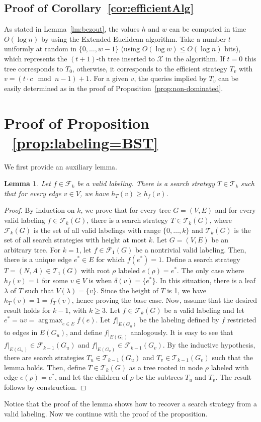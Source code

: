 \documentclass[11pt]{article}
\newtheorem{lemma}{Lemma}[section]
\newcommand{\BSTs}{\mathcal{T}}
\newcommand{\X}{\mathcal{X}}
\DeclareMathOperator*{\argmax}{arg\,max}
\newcommand\+{\mkern2mu}
\newcommand{\T}{T}
\begin{document}
 \subsection{Proof of Corollary~\ref{cor:efficientAlg}}
    
    As stated in Lemma~\ref{lm:bezout}, the values $h$ and $w$ can be computed in time $O(\log n)$ by using the Extended Euclidean algorithm. Take a number $t$ uniformly at random in $\{0,\ldots,w-1\}$ (using $O(\log w)\le O(\log n)$ bits), which represents the $(t+1)$-th tree inserted to $\X$ in the algorithm. If $t=0$ this tree corresponds to $\T_0$, otherwise, it corresponds to the efficient strategy $\T_v$ with $v= (t\cdot c \mod n-1) +1$. For a given $v$, the queries implied by $\T_v$ can be easily determined as in the proof of Proposition~\ref{prop:non-dominated}.

\section{Proof of Proposition ~\ref{prop:labeling=BST}}
    We first provide an auxiliary lemma.

\begin{lemma} \label{lm:labeling<=BST}
    Let $f \in \mathcal{F}_k$ be a valid labeling. There is a search strategy $T \in \BSTs_k$ such that for every edge $v \in V$, we have $h_T(v) \geq h_f(v)$.
\end{lemma}
\begin{proof}
    By induction on $k$, we prove that for every tree $G=(V, E)$ and for every valid labeling $f \in \mathcal{F}_k(G)$, there is a search strategy $T \in \BSTs_k(G)$, where $\mathcal{F}_k(G)$ is the set of all valid labelings with range $\{0, \ldots, k\}$  and $\BSTs_k(G)$ is the set of all search strategies with height at most $k$. Let $G=(V, E)$ be an arbitrary tree. For $k=1$, let $f \in \mathcal{F}_1(G)$ be a nontrivial valid labeling. Then, there is a unique edge $e^* \in E$ for which $f(e^*)=1$. Define a search strategy $T =(N, A) \in \BSTs_1(G)$ with root $\rho$ labeled $e(\rho) = e^*$. The only case where $h_f(v) = 1$ for some $v \in V$ is when $\delta(v) = \{e^*\}$. In this situation, there is a leaf $\lambda$ of $T$ such that $V(\lambda) = \{v\}$. Since the height of $T$ is 1, we have $h_T(v) = 1 = f_T(v)$, hence proving the base case. Now, assume that the desired result holds for $k-1$, with $k \geq 3$. Let $f \in \mathcal{F}_k(G)$ be a valid labeling and let $ e^* = uv = \argmax_{e \in E}f(e)$. Let $f|_{E(G_u)}$ be the labeling defined by $f$ restricted to edges in $E(G_u)$, and define $f|_{E(G_v)}$ analogously. It is easy to see that $f|_{E(G_u)} \in \mathcal{F}_{k-1}(G_u)$ and $f|_{E(G_v)} \in \mathcal{F}_{k-1}(G_v)$. By the inductive hypothesis, there are search strategies $T_u \in \BSTs_{k-1}(G_u)$ and $T_v \in \BSTs_{k-1}(G_v)$ such that the lemma holds. Then, define $T \in \BSTs_k(G)$ as a tree rooted in node $\rho$ labeled with edge $e(\rho)=e^*$, and let the children of $\rho$ be the subtrees $T_u$ and $T_v$. The result follows by construction.
\end{proof}
Notice that the proof of the lemma shows how to recover a search strategy from a valid labeling. Now we continue with the proof of the proposition.
\end{document}
